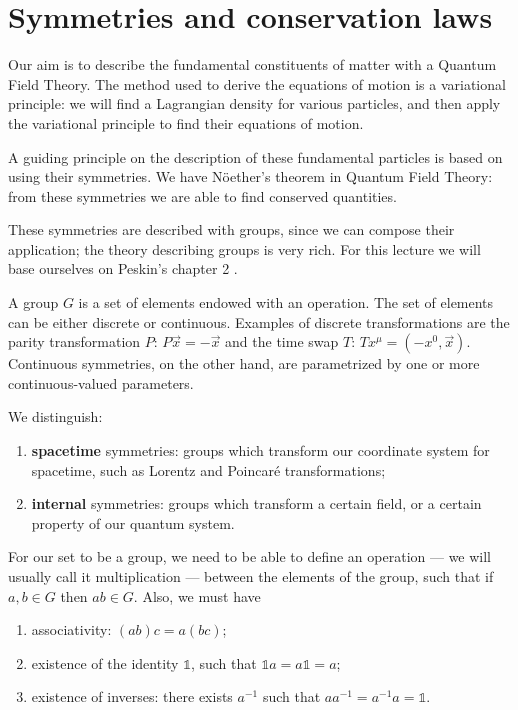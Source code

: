 \documentclass[main.tex]{subfiles}
\begin{document}
\section{Symmetries and conservation laws}


Our aim is to describe the fundamental constituents of matter with a Quantum Field Theory. 
The method used to derive the equations of motion is a variational principle: we will find a Lagrangian density for various particles, and then apply the variational principle to find their equations of motion. 

A guiding principle on the description of these fundamental particles is based on using their symmetries. 
We have Nöether's theorem in Quantum Field Theory: from these symmetries we are able to find conserved quantities. 

These symmetries are described with groups, since we can compose their application; the theory describing groups is very rich. 
For this lecture we will base ourselves on Peskin's chapter 2 \cite[]{peskinConceptsElementaryParticle2019}.

A group \(G\) is a set of elements endowed with an operation. The set of elements can be either discrete or continuous. Examples of discrete transformations are the parity transformation \(P\): \(P \vec{x} = -\vec{x}\) and the time swap \(T\): \(T x^{\mu } = (-x^{0}, \vec{x})\). Continuous symmetries, on the other hand, are parametrized by one or more continuous-valued parameters. 

We distinguish: 
\begin{enumerate}
  \item \textbf{spacetime} symmetries: groups which transform our coordinate system for spacetime, such as Lorentz and Poincaré transformations;
  \item \textbf{internal} symmetries: groups which transform a certain field, or a certain property of our quantum system.
\end{enumerate}

For our set to be a group, we need to be able to define an operation --- we will usually call it multiplication --- between the elements of the group, such that if \(a, b \in G\) then \(ab \in G\). Also, we must have 
\begin{enumerate}
  \item associativity: \((ab)c = a(bc)\);
  \item existence of the identity \(\mathbb{1}\), such that \(\mathbb{1} a = a \mathbb{1} = a\);
  \item existence of inverses: there exists \(a^{-1}\) such that \(a a^{-1} = a^{-1} a = \mathbb{1}\). 
\end{enumerate}
\end{document}
